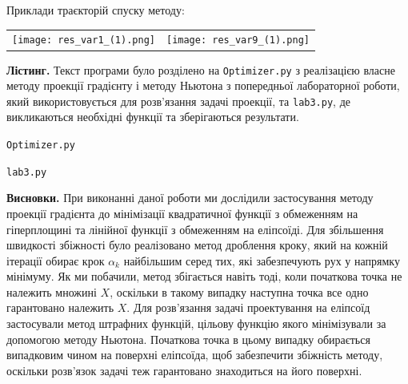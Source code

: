 \documentclass{extreport}
\begin{document}
Приклади траєкторій спуску методу:
\begin{center}
    \begin{tabular}{c c}
        \texttt{[image: res\_var1\_(1).png]} &
        \texttt{[image: res\_var9\_(1).png]} 
    \end{tabular}
\end{center}

\noindent\textbf{Лістинг.}
Текст програми було розділено на \texttt{Optimizer.py} з реалізацією
власне методу проекції градієнту і методу Ньютона з попередньої лабораторної роботи, який використовується
для розв'язання задачі проекції, та \texttt{lab3.py}, де викликаються необхідні функції та зберігаються результати.

\noindent\texttt{Optimizer.py}


\noindent\texttt{lab3.py}


\noindent\textbf{Висновки.} При виконанні даної роботи ми дослідили
застосування методу проекції градієнта до мінімізації квадратичної функції 
з обмеженням на гіперплощині та лінійної функції з обмеженням на еліпсоїді. Для збільшення швидкості збіжності було реалізовано метод дроблення кроку,
який на кожній ітерації обирає крок $\alpha_k$ найбільшим серед тих, які забезпечують рух
у напрямку мінімуму. Як ми побачили, метод збігається навіть тоді, коли початкова точка не належить множині $X$, оскільки
в такому випадку наступна точка все одно гарантовано належить $X$.
Для розв'язання задачі проектування на еліпсоїд застосували метод штрафних функцій, цільову функцію якого мінімізували
за допомогою методу Ньютона. Початкова точка в цьому випадку обирається випадковим чином на поверхні еліпсоїда, щоб
забезпечити збіжність методу, оскільки розв'язок задачі теж гарантовано знаходиться на його поверхні.
\end{document}

